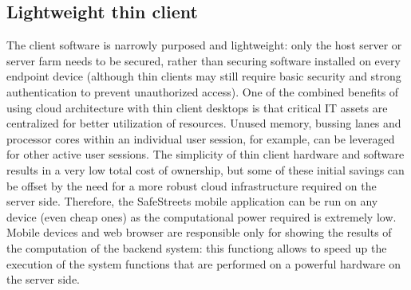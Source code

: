 \subsection{Lightweight thin client}
The client software is narrowly purposed and lightweight: only the host server or server farm needs to be secured, rather than securing software installed on every endpoint device (although thin clients may still require basic security and strong authentication to prevent unauthorized access). One of the combined benefits of using cloud architecture with thin client desktops is that critical IT assets are centralized for better utilization of resources. Unused memory, bussing lanes and processor cores within an individual user session, for example, can be leveraged for other active user sessions.
\newline
The simplicity of thin client hardware and software results in a very low total cost of ownership, but some of these initial savings can be offset by the need for a more robust cloud infrastructure required on the server side. Therefore, the SafeStreets mobile application can be run on any device (even cheap ones) as the computational power required is extremely low.
\newline
Mobile devices and web browser are responsible only for showing the results of the computation of the backend system: this functiong allows to speed up the execution of the system functions that are performed on a powerful hardware on the server side.

